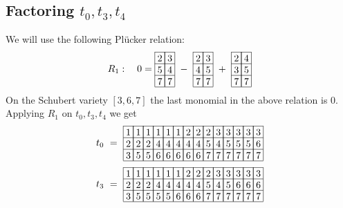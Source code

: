 \subsection{Factoring \(t_0,t_3,t_4\)}
We will use the  following Pl\"{u}cker relation:
\begin{align*}
R_1 :\ \ \ 0 = 
\begin{array}[c]{*{2}c}\cline{1-2}
\lr{2}&\lr{3}\\\cline{1-2}
\lr{5}&\lr{4}\\\cline{1-2}
\lr{7}&\lr{7}\\\cline{1-2}
\end{array}
\ -\ 
\begin{array}[c]{*{2}c}\cline{1-2}
\lr{2}&\lr{3}\\\cline{1-2}
\lr{4}&\lr{5}\\\cline{1-2}
\lr{7}&\lr{7}\\\cline{1-2}
\end{array}
\ +\ 
\begin{array}[c]{*{2}c}\cline{1-2}
\lr{2}&\lr{4}\\\cline{1-2}
\lr{3}&\lr{5}\\\cline{1-2}
\lr{7}&\lr{7}\\\cline{1-2}
\end{array}
\end{align*}
On  the Schubert variety \([3,6,7]\) the last monomial in the above relation is \(0\).
Applying \(R_1\) on \(t_0,t_3,t_4\)  we get
\[
    t_0\ =\ 
\begin{array}[c]{*{14}c}\cline{1-14}
\lr{1}&\lr{1}&\lr{1}&\lr{1}&\lr{1}&\lr{1}&\lr{2}&\lr{2}&\lr{2}&\lr{3}&\lr{3}&\lr{3}&\lr{3}&\lr{3}\\\cline{1-14}
\lr{2}&\lr{2}&\lr{2}&\lr{4}&\lr{4}&\lr{4}&\lr{4}&\lr{4}&\lr{5}&\lr{4}&\lr{5}&\lr{5}&\lr{5}&\lr{6}\\\cline{1-14}
\lr{3}&\lr{5}&\lr{5}&\lr{6}&\lr{6}&\lr{6}&\lr{6}&\lr{6}&\lr{7}&\lr{7}&\lr{7}&\lr{7}&\lr{7}&\lr{7}\\\cline{1-14}
\end{array}
\]
\[   
t_3\ =\ 
\begin{array}[c]{*{14}c}\cline{1-14}
\lr{1}&\lr{1}&\lr{1}&\lr{1}&\lr{1}&\lr{1}&\lr{2}&\lr{2}&\lr{2}&\lr{3}&\lr{3}&\lr{3}&\lr{3}&\lr{3}\\\cline{1-14}
\lr{2}&\lr{2}&\lr{2}&\lr{4}&\lr{4}&\lr{4}&\lr{4}&\lr{4}&\lr{5}&\lr{4}&\lr{5}&\lr{6}&\lr{6}&\lr{6}\\\cline{1-14}
\lr{3}&\lr{5}&\lr{5}&\lr{5}&\lr{5}&\lr{6}&\lr{6}&\lr{6}&\lr{7}&\lr{7}&\lr{7}&\lr{7}&\lr{7}&\lr{7}\\\cline{1-14}
\end{array}
\]
